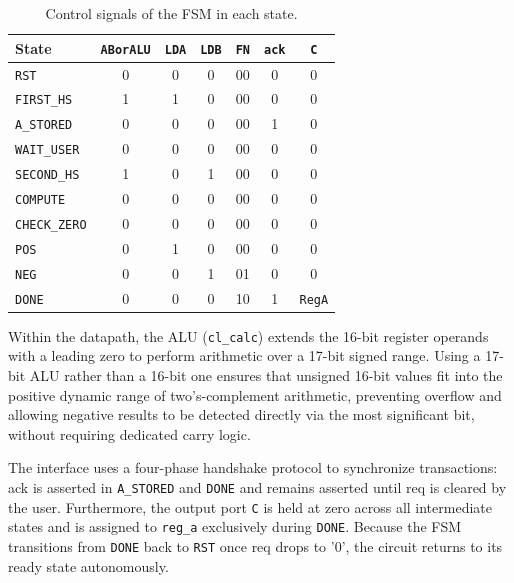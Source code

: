 \begin{table}[H]
    \centering
    \footnotesize
    \renewcommand{\arraystretch}{0.9}
    \begin{tabular}{lcccccc}
        \toprule
        State & \texttt{ABorALU} & \texttt{LDA} & \texttt{LDB} & \texttt{FN} & \texttt{ack} & \texttt{C} \\
        \midrule
        \texttt{RST}        & 0 & 0 & 0 & 00 & 0 & 0 \\
        \texttt{FIRST\_HS}  & 1 & 1 & 0 & 00 & 0 & 0 \\
        \texttt{A\_STORED}  & 0 & 0 & 0 & 00 & 1 & 0 \\
        \texttt{WAIT\_USER} & 0 & 0 & 0 & 00 & 0 & 0 \\
        \texttt{SECOND\_HS} & 1 & 0 & 1 & 00 & 0 & 0 \\
        \texttt{COMPUTE}    & 0 & 0 & 0 & 00 & 0 & 0 \\
        \texttt{CHECK\_ZERO}& 0 & 0 & 0 & 00 & 0 & 0 \\
        \texttt{POS}        & 0 & 1 & 0 & 00 & 0 & 0 \\
        \texttt{NEG}        & 0 & 0 & 1 & 01 & 0 & 0 \\
        \texttt{DONE}       & 0 & 0 & 0 & 10 & 1 & \texttt{RegA} \\
        \bottomrule
    \end{tabular}
    \caption{Control signals of the FSM in each state.}
    \label{tab:fsm_controls}
\end{table}

Within the datapath, the ALU (\texttt{cl\_calc}) extends the 16-bit register operands with a leading zero to perform arithmetic over a 17-bit signed range. Using a 17-bit ALU rather than a 16-bit one ensures that unsigned 16-bit values fit into the positive dynamic range of two's-complement arithmetic, preventing overflow and allowing negative results to be detected directly via the most significant bit, without requiring dedicated carry logic. 

The interface uses a four-phase handshake protocol to synchronize transactions: ack is asserted in \texttt{A\_STORED} and \texttt{DONE} and remains asserted until req is cleared by the user. Furthermore, the output port \texttt{C} is held at zero across all intermediate states and is assigned to \texttt{reg\_a} exclusively during \texttt{DONE}. Because the FSM transitions from \texttt{DONE} back to \texttt{RST} once req drops to '0', the circuit returns to its ready state autonomously.

